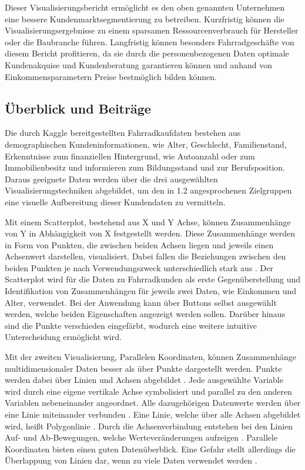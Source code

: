 \documentclass[usegeometry=true]{scrartcl}
\begin{document}
Dieser Visualisierungsbericht ermöglicht es den oben genannten Unternehmen eine bessere Kundenmarktsegmentierung zu betreiben. Kurzfristig können die Visualisierungsergebnisse zu einem sparsamen Ressourcenverbrauch für Hersteller oder die Baubranche führen. Langfristig können besonders Fahrradgeschäfte von diesem Bericht profitieren, da sie durch die personenbezogenen Daten optimale Kundenakquise und Kundenberatung garantieren können und anhand von Einkommensparametern Preise bestmöglich bilden können. 



\subsection{Überblick und Beiträge}
Die durch Kaggle \cite{Dedhia.22.09.2020} bereitgestellten Fahrradkaufdaten bestehen aus demographischen Kundeninformationen, wie Alter, Geschlecht, Familienstand,  Erkenntnisse zum finanziellen Hintergrund, wie Autoanzahl oder zum Immobilienbesitz und informieren  zum Bildungsstand und zur Berufsposition. Daraus geeignete Daten werden über die drei ausgewählten Visualisierungstechniken  abgebildet, um den in 1.2 angesprochenen Zielgruppen eine visuelle Aufbereitung dieser Kundendaten zu vermitteln. 

Mit einem Scatterplot, bestehend aus X und Y Achse, können Zusammenhänge von Y in Abhängigkeit von X festgestellt werden. Diese Zusammenhänge werden in Form von Punkten, die zwischen beiden Achsen liegen und jeweils einen Achsenwert darstellen, visualisiert. Dabei fallen die Beziehungen zwischen den beiden Punkten je nach Verwendungszweck unterschiedlich stark aus \cite{Yi.16.10.2019,Anscombe.1973,Cleveland.1984}. Der Scatterplot wird für die Daten zu Fahrradkunden als erste Gegenüberstellung und Identifikation von Zusammenhängen für jeweils zwei Daten, wie Einkommen und Alter, verwendet. 
Bei der Anwendung kann über Buttons selbst ausgewählt werden, welche beiden Eigenschaften angezeigt werden sollen. Darüber hinaus sind die Punkte verschieden eingefärbt, wodurch eine weitere intuitive Unterscheidung ermöglicht wird. 

Mit der zweiten Visualisierung, Parallelen Koordinaten, können Zusammenhänge multidimensionaler Daten besser als über Punkte dargestellt werden. Punkte werden dabei über Linien und Achsen abgebildet \cite{Inselberg.1990}. Jede ausgewählte Variable wird durch eine eigene vertikale Achse symbolisiert und parallel zu den anderen Variablen nebeneinander angeordnet. Alle dazugehörigen Datenwerte werden über eine Linie miteinander verbunden \cite{Moustafa.2006}. Eine Linie, welche über alle Achsen abgebildet wird, heißt Polygonlinie \cite{Heinrich.2015}. Durch die Achsenverbindung entstehen bei den Linien Auf- und Ab-Bewegungen, welche Werteveränderungen aufzeigen \cite{Few.2008}. Parallele Koordinaten bieten einen guten Datenüberblick. Eine Gefahr stellt allerdings die Überlappung von Linien dar, wenn zu viele Daten verwendet werden \cite{Heinrich.2009}.
\end{document}
